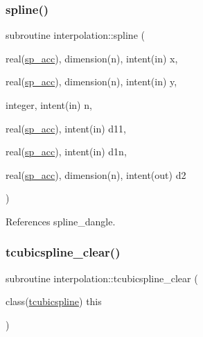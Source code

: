 \subsubsection{\texorpdfstring{spline()}{spline()}}
{\footnotesize\ttfamily subroutine interpolation\+::spline (\begin{DoxyParamCaption}\item[{real(\mbox{\hyperlink{namespaceinterpolation_af72aa9a05feb8ef90b2d26e4a013abf3}{sp\+\_\+acc}}), dimension(n), intent(in)}]{x,  }\item[{real(\mbox{\hyperlink{namespaceinterpolation_af72aa9a05feb8ef90b2d26e4a013abf3}{sp\+\_\+acc}}), dimension(n), intent(in)}]{y,  }\item[{integer, intent(in)}]{n,  }\item[{real(\mbox{\hyperlink{namespaceinterpolation_af72aa9a05feb8ef90b2d26e4a013abf3}{sp\+\_\+acc}}), intent(in)}]{d11,  }\item[{real(\mbox{\hyperlink{namespaceinterpolation_af72aa9a05feb8ef90b2d26e4a013abf3}{sp\+\_\+acc}}), intent(in)}]{d1n,  }\item[{real(\mbox{\hyperlink{namespaceinterpolation_af72aa9a05feb8ef90b2d26e4a013abf3}{sp\+\_\+acc}}), dimension(n), intent(out)}]{d2 }\end{DoxyParamCaption})}



References spline\+\_\+dangle.

\mbox{\label{namespaceinterpolation_aef383fa49a233bca20a6cd742319df7e}} 
\subsubsection{\texorpdfstring{tcubicspline\+\_\+clear()}{tcubicspline\_clear()}}
{\footnotesize\ttfamily subroutine interpolation\+::tcubicspline\+\_\+clear (\begin{DoxyParamCaption}\item[{class(\mbox{\hyperlink{structinterpolation_1_1tcubicspline}{tcubicspline}})}]{this }\end{DoxyParamCaption})}

\mbox{\label{namespaceinterpolation_a2ffb9d3c161ab80ba29f5256b039ea57}} 
